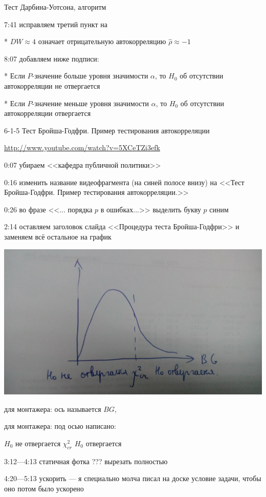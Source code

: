 \documentclass[12pt,a4paper]{article}
\begin{document}
Тест Дарбина-Уотсона, алгоритм

7:41 исправляем третий пункт на

* $DW\approx 4$ означает отрицательную автокорреляцию $\hat{\rho} \approx -1$

8:07 добавляем ниже подписи:

* Если $P$-значение больше уровня значимости $\alpha$, то $H_0$ об отсутствии автокорреляции не отвергается

* Если $P$-значение меньше уровня значимости $\alpha$, то $H_0$ об отсутствии автокорреляции отвергается

6-1-5 Тест Бройша-Годфри. Пример тестирования автокорреляции

\url{http://www.youtube.com/watch?v=5XCeTZi3efk}

0:07 убираем <<кафедра публичной политики>>

0:16 изменить название видеофрагмента (на синей полосе внизу) на <<Тест Бройша-Годфри. Пример тестирования автокорреляции.>>

0:26 во фразе <<... порядка $p$ в ошибках...>> выделить букву $p$ синим 

2:14 оставляем заголовок слайда <<Процедура теста Бройша-Годфри>> и заменяем всё остальное на график

\includegraphics[scale=0.05, angle=0]{bg_test.jpg} 

для монтажера: ось называется $BG$, 

для монтажера: под осью написано: 

$H_0$ не отвергается \; $\chi^2_{cr}$ \; $H_0$ отвергается

3:12---4:13 статичная фотка ??? вырезать полностью 

4:20---5:13 ускорить --- я специально молча писал на доске условие задачи, чтобы оно потом было ускорено
\end{document}

